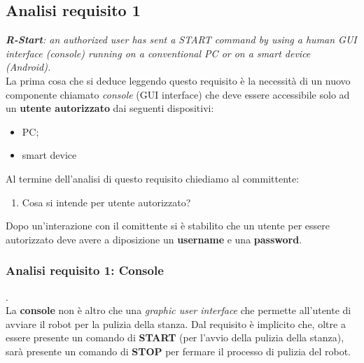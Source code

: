 \documentclass{llncs}
\begin{document}
\subsection{Analisi requisito 1}
\label{ReqAnalysis1}
\textit{\textbf{R-Start}: an authorized user has sent a START command by using a human GUI interface (console) running on a conventional PC or on a smart device (Android).}
\vspace*{3ex}
\\
La prima cosa che si deduce leggendo questo requisito \`e la necessit\`a di un nuovo componente chiamato \textit{console} (GUI interface) che deve essere accessibile solo ad un \textbf{utente autorizzato} dai seguenti dispositivi:
\begin{itemize}
    \item PC;
    \item smart device
\end{itemize}
Al termine dell'analisi di questo requisito chiediamo al committente:
\begin{enumerate}
    \item Cosa si intende per utente autorizzato?
\end{enumerate}
Dopo un'interazione con il comittente si \`e stabilito che un utente per essere autorizzato deve avere a diposizione un \textbf{username} e una \textbf{password}.



\subsubsection{Analisi requisito 1: Console} .
\label{ReqAnalysis1Console}
\vspace*{1ex}
\\
La \textbf{console} non \`e altro che una \textit{graphic user interface} che permette all'utente di avviare il robot per la pulizia della stanza. Dal requisito \`e implicito che, oltre a essere presente un comando di \textbf{START} (per l'avvio della pulizia della stanza), sar\`a presente un comando di \textbf{STOP} per fermare il processo di pulizia del robot.\\




\end{document}
